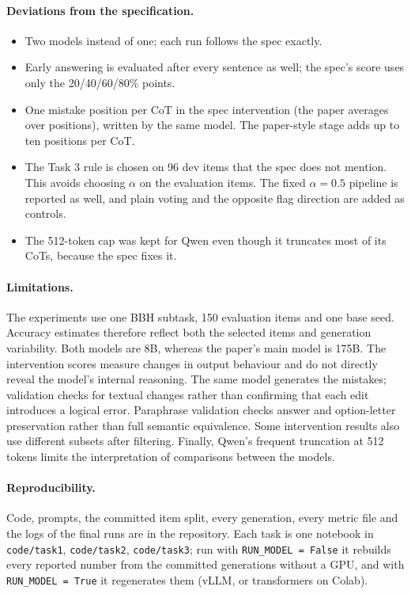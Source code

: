 \documentclass[11pt,a4paper]{article}
\newcommand{\code}[1]{\texttt{\small #1}}
\begin{document}
\paragraph{Deviations from the specification.}
\begin{itemize}
\item Two models instead of one; each run follows the spec exactly.
\item Early answering is evaluated after every sentence as well; the spec's score uses only the 20/40/60/80\% points.
\item One mistake position per CoT in the spec intervention (the paper averages over positions), written by the same model.
The paper-style stage adds up to ten positions per CoT.
\item The Task 3 rule is chosen on 96 dev items that the spec does not mention. This avoids choosing $\alpha$ on the
evaluation items. The fixed $\alpha=0.5$ pipeline is reported as well, and plain voting and the opposite flag direction are
added as controls.
\item The 512-token cap was kept for Qwen even though it truncates most of its CoTs, because the spec fixes it.
\end{itemize}

\paragraph{Limitations.} The experiments use one BBH subtask, 150 evaluation items and one base seed. Accuracy estimates
therefore reflect both the selected items and generation variability. Both models are 8B, whereas the paper's main
model is 175B. The intervention scores measure changes in output behaviour and do not directly reveal the model's
internal reasoning. The same model generates the mistakes; validation checks for textual changes rather than
confirming that each edit introduces a logical error. Paraphrase validation checks answer and option-letter
preservation rather than full semantic equivalence. Some intervention results also use different subsets after
filtering. Finally, Qwen's frequent truncation at 512 tokens limits the interpretation of comparisons between the models.

\paragraph{Reproducibility.} Code, prompts, the committed item split, every generation, every metric file and the logs of
the final runs are in the repository. Each task is one notebook in \code{code/task1}, \code{code/task2}, \code{code/task3}; run with
\code{RUN\_MODEL = False} it rebuilds every reported number from the committed generations without a GPU, and with
\code{RUN\_MODEL = True} it regenerates them (vLLM, or transformers on Colab).
\end{document}
